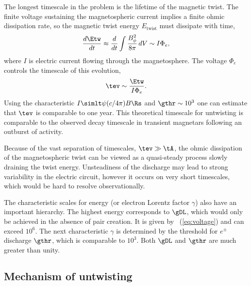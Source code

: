 The longest timescale in the problem is the lifetime of the magnetic twist.
The finite voltage sustaining the magnetospheric current implies a finite ohmic
dissipation rate, so the magnetic twist energy $E_\mathrm{twist}$ must dissipate with time,
\begin{equation}
  \label{eq:11}
  \frac{d\Etw}{dt}
  \approx
  \frac{d}{dt}\int\frac{B_{\phi}^2}{8\pi} \, dV \sim I\Phi_{e},
\end{equation}
where $I$ is electric current flowing through the magnetosphere.
The voltage $\Phi_e$ controls the timescale of this evolution,
\begin{equation}
  \tev\sim \frac{\Etw}{I\Phi_{e}}.
\end{equation}
Using the characteristic $I\simlt \psi (c/4\pi)B\Rs$ and $\gthr\sim 10^3$ one
can estimate that $\tev$ is comparable to one year. This theoretical timescale for
untwisting is comparable to the observed decay timescale in transient
magnetars following an outburst of activity.

Because of the vast separation of timescales, $\tev\gg \tA$, the ohmic dissipation
of the magnetospheric twist can be viewed as a quasi-steady process
slowly draining the twist energy. Unsteadiness of the discharge may lead to
strong variability in the electric circuit, however
it occurs
on very short timescales, which
would be hard to resolve observationally.

The characteristic scales for energy (or electron Lorentz factor $\gamma$) also have
an important hierarchy. The highest energy corresponds to $\gDL$, which would only
be achieved in the absence of pair creation.
It
is given by \Eq~(\ref{eq:voltage})
and can
exceed $10^6$. The next characteristic $\gamma$ is determined by the threshold for
$e^\pm$ discharge $\gthr$, which is comparable to $10^3$. Both $\gDL$ and $\gthr$
are much greater than unity.

\subsection{Mechanism of untwisting}
\label{sec:twist-theory}

